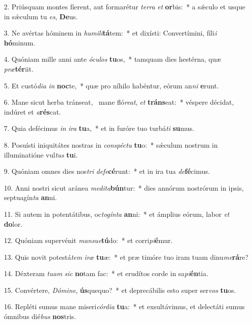 2. Priúsquam montes fíerent, aut formarétur \textit{ter}\textit{ra} \textit{et} \textbf{or}bis:~*  a sǽculo et usque in sǽculum tu \textit{es}, \textbf{De}us.\

3. Ne avértas hóminem in \textit{hu}\textit{mi}\textit{li}\textbf{tá}tem:~*  et dixísti: Convertímini, fíli\textit{i} \textbf{hó}minum.\

4. Quóniam mille anni ante \textit{ó}\textit{cu}\textit{los} \textbf{tu}os,~*  tamquam dies hestérna, quæ \textit{præ}\textbf{tér}iit.\

5. Et custó\textit{di}\textit{a} \textit{in} \textbf{noc}te,~*  quæ pro níhilo habéntur, eórum an\textit{ni} \textbf{e}runt.\

6. Mane sicut herba tránseat, \dag\  mane fló\textit{re}\textit{at}, \textit{et} \textbf{tráns}eat:~*  véspere décidat, indúret et \textit{a}\textbf{rés}cat.\

7. Quia defécimus \textit{in} \textit{i}\textit{ra} \textbf{tu}a,~*  et in furóre tuo turbá\textit{ti} \textbf{su}mus.\

8. Posuísti iniquitátes nostras in \textit{con}\textit{spéc}\textit{tu} \textbf{tu}o:~*  sǽculum nostrum in illuminatióne vul\textit{tus} \textbf{tu}i.\

9. Quóniam omnes dies nos\textit{tri} \textit{de}\textit{fe}\textbf{cé}runt:~*  et in ira tua \textit{de}\textbf{fé}cimus.\

10. Anni nostri sicut aránea \textit{me}\textit{di}\textit{ta}\textbf{bún}tur:~*  dies annórum nostrórum in ipsis, septuagín\textit{ta} \textbf{an}ni.\

11. Si autem in potentátibus, oc\textit{to}\textit{gín}\textit{ta} \textbf{an}ni:~*  et ámplius eórum, labor \textit{et} \textbf{do}lor.\

12. Quóniam supervénit \textit{man}\textit{su}\textit{e}\textbf{tú}do:~*  et corri\textit{pi}\textbf{é}mur.\

13. Quis novit potestá\textit{tem} \textit{i}\textit{ræ} \textbf{tu}æ:~*  et præ timóre tuo iram tuam dinu\textit{me}\textbf{rá}re?\

14. Déxteram \textit{tu}\textit{am} \textit{sic} \textbf{no}tam fac:~*  et erudítos corde in sa\textit{pi}\textbf{én}tia.\

15. Convértere, \textit{Dó}\textit{mi}\textit{ne}, \textbf{ús}quequo?~*  et deprecábilis esto super ser\textit{vos} \textbf{tu}os.\

16. Repléti sumus mane miseri\textit{cór}\textit{di}\textit{a} \textbf{tu}a:~*  et exsultávimus, et delectáti sumus ómnibus dié\textit{bus} \textbf{nos}tris.\

